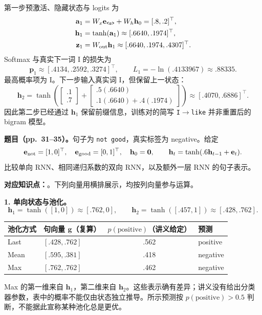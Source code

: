 \begin{workedsolution}
第一步预激活、隐藏状态与 logits 为
\begin{align*}
 \mathbf a_1&=W_x\mathbf e_{\texttt{<s>}}+W_h\mathbf h_0=[.8,.2]^\top,\\
 \mathbf h_1&=\tanh(\mathbf a_1)\approx[.6640,.1974]^\top,\\
 \mathbf z_1&=W_{\rm out}\mathbf h_1\approx[.6640,.1974,.4307]^\top.
\end{align*}
Softmax 与真实下一词 I 的损失为
\[
 \mathbf p_1\approx[.4134,.2592,.3274]^\top,\qquad
 L_1=-\ln(.4133967)\approx\boxed{.88335}.
\]
最高概率项为 I。下一步输入真实词 I，但保留上一状态：
\[
 \mathbf h_2=\tanh\!\left(
 \begin{bmatrix}.1\\.7\end{bmatrix}
 +\begin{bmatrix}.5(.6640)\\.1(.6640)+.4(.1974)\end{bmatrix}\right)
 \approx[.4070,.6886]^\top.
\]
因此第二步已经通过 $\mathbf h_1$ 保留前缀信息，训练对的简写 \texttt{I}$\to$\texttt{like} 并非重置后的 bigram 模型。
\end{workedsolution}

\nopagebreak[4]
\textbf{题目（pp.~31--35）。}句子为 \texttt{not good}，真实标签为 negative。给定
\[
 \mathbf e_{\rm not}=[1,0]^\top,\quad\mathbf e_{\rm good}=[0,1]^\top,
 \quad\mathbf h_0=\mathbf0,\qquad
 \mathbf h_t=\tanh(.6\mathbf h_{t-1}+\mathbf e_t).
\]
比较单向 RNN、相同递归系数的双向 RNN，以及额外一层 RNN 的句子表示。

\textbf{对应知识点：}。下列向量用横排展示，均按列向量参与运算。

\textbf{1. 单向状态与池化。}
\[
 \mathbf h_1=\tanh([1,0])\approx[.762,0],\qquad
 \mathbf h_2=\tanh([.457,1])\approx[.428,.762].
\]
\begin{center}
\small
\begin{tabular}{@{}l l c l@{}}
\toprule
池化方式 & 句向量 $\mathbf g$（复算） & $p(\mathrm{positive})$（讲义给定） & 预测 \\
\midrule
Last & $[.428,.762]$ & .562 & positive \\
Mean & $[.595,.381]$ & .418 & negative \\
Max & $[.762,.762]$ & .462 & negative \\
\bottomrule
\end{tabular}
\end{center}
Max 的第一维来自 $\mathbf h_1$，第二维来自 $\mathbf h_2$。这些表示确有差异；讲义没有给出分类器参数，表中的概率不能仅由状态独立推导。所示预测按 $p(\mathrm{positive})>0.5$ 判断，不能据此宣称某种池化总是更优。

